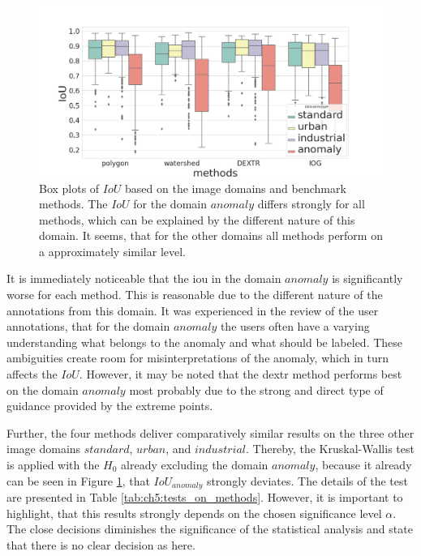 \begin{figure}[h!]
	\centering
	\includegraphics[width=\textwidth]{figures/chap52_iou_methods_over_domains_boxplot.png}
	\caption [Box plots of image domains and methods on  $ IoU $]{
		Box plots of $ IoU $ based on the image domains and benchmark methods.
		The $ IoU $ for the domain $ anomaly $ differs strongly for all methods, which can be explained by the different nature of this domain.
		It seems, that for the other domains all methods perform on a approximately similar level.
	}\label{fig:ch5:sec2:methods_over_domain_iou}
\end{figure}

It is immediately noticeable that the \gls{iou} in the domain $ anomaly $ is significantly worse for each method.
This is reasonable due to the different nature of the annotations from this domain.
It was experienced in the review of the user annotations, that for the domain $ anomaly $ the users often have a varying understanding what belongs to the anomaly and what should be labeled.
These ambiguities create room for misinterpretations of the anomaly, which in turn affects the $ IoU $.
However, it may be noted that the \gls{dextr} method performs best on the domain $ anomaly $ most probably due to the strong and direct type of guidance provided by the extreme points.

Further, the four methods deliver comparatively similar results on the three other image domains $ standard $, $ urban $, and $ industrial $.
Thereby, the Kruskal-Wallis test is applied with the $ H_{0} $ already excluding the domain $ anomaly $, because it already can be seen in Figure \ref{fig:ch5:sec2:methods_over_domain_iou}, that $ IoU_{anomaly} $ strongly deviates.
The details of the test are presented in Table \ref{tab:ch5:tests_on_methods}.
However, it is important to highlight, that this results strongly depends on the chosen significance level $ \alpha $.
The close decisions diminishes the significance of the statistical analysis and state that there is no clear decision as here.

